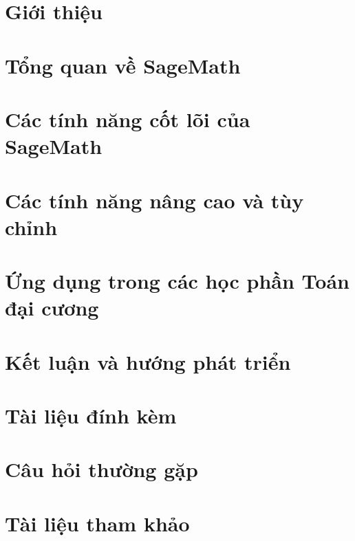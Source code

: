 \documentclass[12pt, a4paper, twoside]{report} %
\begin{document}
	
	
	
	
	
	
	\tableofcontents
	\listoffigures
	\listoftables
	
	\chapter{Giới thiệu}
	
	
	\chapter{Tổng quan về SageMath}
	
	
	\chapter{Các tính năng cốt lõi của SageMath}
	
	
	\chapter{Các tính năng nâng cao và tùy chỉnh}
	
	
	\chapter{Ứng dụng trong các học phần Toán đại cương}
	
	
	\chapter{Kết luận và hướng phát triển}
	
	
	
	
	\appendix	
	\chapter{Tài liệu đính kèm}
	
	
	\chapter{Câu hỏi thường gặp}
	
	
	\chapter{Tài liệu tham khảo}
	
	
	

	
\end{document}
